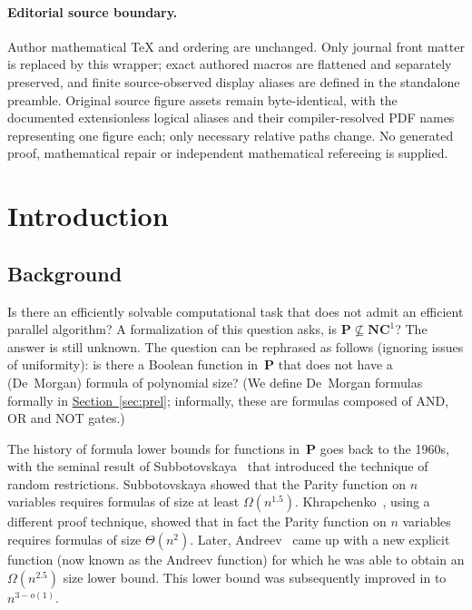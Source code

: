 \documentclass[11pt]{article}
\numberwithin{equation}{section}
\theoremstyle{definition}
\theoremstyle{plain}
\newcommand{\expref}[2]{\hyperref[#2]{#1~\ref{#2}}}
\theoremstyle{definition}\newtheorem{notation}[theorem]{Notation}\theoremstyle{plain}
\renewcommand{\P}{\mathbf{P}}
\newcommand{\NC}{\mathbf{NC}}
\theoremstyle{definition}
\theoremstyle{plain}
\begin{document}
\paragraph{Editorial source boundary.}
Author mathematical TeX and ordering are unchanged. Only journal front matter is replaced by this wrapper; exact authored macros are flattened and separately preserved, and finite source-observed display aliases are defined in the standalone preamble. Original source figure assets remain byte-identical, with the documented extensionless logical aliases and their compiler-resolved PDF names representing one figure each; only necessary relative paths change. No generated proof, mathematical repair or independent mathematical refereeing is supplied. 
\clearpage

%
%
%

\section{Introduction}

\subsection{Background}

%
%
%
%
%
Is there an efficiently solvable computational task
that does not admit an efficient parallel algorithm?  %
%
%
A formalization of this question asks,  %
is $\P\not\subseteq\NC^{1}$? The answer
%
is still unknown. The question can be rephrased as follows (ignoring issues of uniformity): 
is there a
Boolean  %
function in~$\P$ that does not have a (De~Morgan) formula of
polynomial size?   %
%
%
%
(We define De~Morgan formulas formally in \expref{Section}{sec:prel}; informally, these are formulas composed of AND, OR and NOT gates.)

The history of formula lower bounds for functions in~$\P$ goes back
to the 1960s, with the seminal result of Subbotovskaya~\cite{S61}
that introduced the technique of random restrictions. Subbotovskaya
showed that the Parity function on $n$ variables requires formulas
of size at least $\Omega(n^{1.5})$. Khrapchenko~\cite{K72}, using
a different proof technique, showed that in fact the Parity function
on $n$ variables requires formulas of size $\Theta(n^{2})$. Later,
Andreev~\cite{A87} came up with a new explicit function (now known
as the Andreev function) for which he was able to obtain an $\Omega(n^{2.5})$
size lower bound. This lower bound was subsequently improved
%
%
in  %
\cite{IN93,PZ93,H98,T14}
to $n^{3-o(1)}$.
\end{document}
